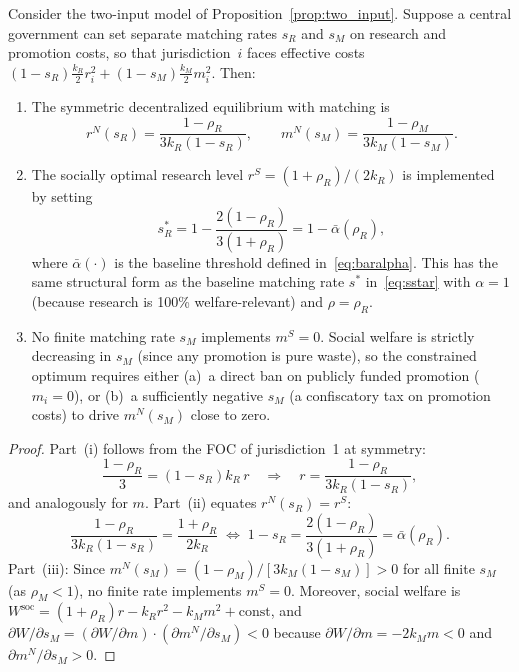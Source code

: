 \begin{proposition}\label{prop:two_instrument}
Consider the two-input model of Proposition~\ref{prop:two_input}. Suppose a central government can set separate matching rates $s_R$ and $s_M$ on research and promotion costs, so that jurisdiction~$i$ faces effective costs $(1-s_R)\frac{k_R}{2}r_i^2+(1-s_M)\frac{k_M}{2}m_i^2$. Then:
\begin{enumerate}
\item[(i)] The symmetric decentralized equilibrium with matching is
\[
r^N(s_R)=\frac{1-\rho_R}{3k_R(1-s_R)},\qquad
m^N(s_M)=\frac{1-\rho_M}{3k_M(1-s_M)}.
\]
\item[(ii)] The socially optimal research level $r^S=(1+\rho_R)/(2k_R)$ is implemented by setting
\begin{equation}\label{eq:sR_star}
s_R^{*}=1-\frac{2(1-\rho_R)}{3(1+\rho_R)}
=1-\bar\alpha(\rho_R),
\end{equation}
where $\bar\alpha(\cdot)$ is the baseline threshold defined in~\eqref{eq:baralpha}. This has the same structural form as the baseline matching rate $s^{*}$ in~\eqref{eq:sstar} with $\alpha=1$ (because research is 100\% welfare-relevant) and $\rho=\rho_R$.
\item[(iii)] No finite matching rate $s_M$ implements $m^S=0$. Social welfare is strictly decreasing in $s_M$ (since any promotion is pure waste), so the constrained optimum requires either (a)~a direct ban on publicly funded promotion ($m_i=0$), or (b)~a sufficiently negative $s_M$ (a confiscatory tax on promotion costs) to drive $m^N(s_M)$ close to zero.
\end{enumerate}
\end{proposition}

\begin{proof}
Part~(i) follows from the FOC of jurisdiction~1 at symmetry:
\[
\frac{1-\rho_R}{3}=(1-s_R)k_R\, r \quad\Rightarrow\quad r=\frac{1-\rho_R}{3k_R(1-s_R)},
\]
and analogously for $m$.  Part~(ii) equates $r^N(s_R)=r^S$:
\[
\frac{1-\rho_R}{3k_R(1-s_R)}=\frac{1+\rho_R}{2k_R}
\;\Longleftrightarrow\;
1-s_R=\frac{2(1-\rho_R)}{3(1+\rho_R)}=\bar\alpha(\rho_R).
\]
Part~(iii): Since $m^N(s_M)=(1-\rho_M)/[3k_M(1-s_M)]>0$ for all finite $s_M$ (as $\rho_M<1$), no finite rate implements $m^S=0$. Moreover, social welfare is $W^{\mathrm{soc}}=(1+\rho_R)r-k_R r^2-k_M m^2+\mathrm{const}$, and $\partial W/\partial s_M = (\partial W/\partial m)\cdot(\partial m^N/\partial s_M)<0$ because $\partial W/\partial m=-2k_M m<0$ and $\partial m^N/\partial s_M>0$.
\end{proof}

